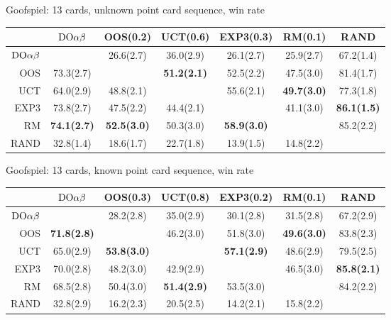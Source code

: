 \begin{table}
\centering
\begin{scriptsize}

Goofspiel: 13 cards, unknown point card sequence, win rate
\begin{tabular}{|r|cccccc|}\hline
&$\textrm{DO}\alpha\beta$&OOS(0.2)&UCT(0.6)&EXP3(0.3)&RM(0.1)&RAND\\\hline
$\textrm{DO}\alpha\beta$&&26.6(2.7)&36.0(2.9)&26.1(2.7)&25.9(2.7)&67.2(1.4)\\
OOS&73.3(2.7)&&\textbf{51.2(2.1)}&52.5(2.2)&47.5(3.0)&81.4(1.7)\\
UCT&64.0(2.9)&48.8(2.1)&&55.6(2.1)&\textbf{49.7(3.0)}&77.3(1.8)\\
EXP3&73.8(2.7)&47.5(2.2)&44.4(2.1)&&41.1(3.0)&\textbf{86.1(1.5)}\\
RM&\textbf{74.1(2.7)}&\textbf{52.5(3.0)}&50.3(3.0)&\textbf{58.9(3.0)}&&85.2(2.2)\\
RAND&32.8(1.4)&18.6(1.7)&22.7(1.8)&13.9(1.5)&14.8(2.2)&\\
\hline
\end{tabular}

Goofspiel: 13 cards, known point card sequence, win rate
\begin{tabular}{|r|cccccc|}\hline
&$\textrm{DO}\alpha\beta$&OOS(0.3)&UCT(0.8)&EXP3(0.2)&RM(0.1)&RAND\\\hline
$\textrm{DO}\alpha\beta$&&28.2(2.8)&35.0(2.9)&30.1(2.8)&31.5(2.8)&67.2(2.9)\\
OOS&\textbf{71.8(2.8)}&&46.2(3.0)&51.8(3.0)&\textbf{49.6(3.0)}&83.8(2.3)\\
UCT&65.0(2.9)&\textbf{53.8(3.0)}&&\textbf{57.1(2.9)}&48.6(2.9)&79.5(2.5)\\
EXP3&70.0(2.8)&48.2(3.0)&42.9(2.9)&&46.5(3.0)&\textbf{85.8(2.1)}\\
RM&68.5(2.8)&50.4(3.0)&\textbf{51.4(2.9)}&53.5(3.0)&&84.2(2.2)\\
RAND&32.8(2.9)&16.2(2.3)&20.5(2.5)&14.2(2.1)&15.8(2.2)&\\
\hline
\end{tabular}


\end{scriptsize}
\end{table}
